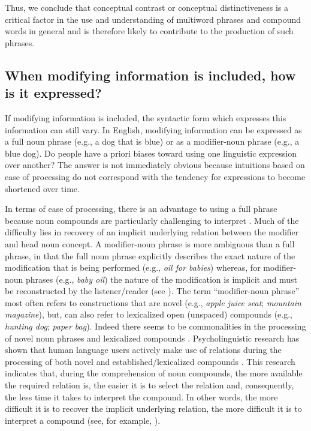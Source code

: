 \documentclass[output=paper]{langsci/langscibook}
\begin{document}
Thus, we conclude that conceptual contrast or conceptual
distinctiveness is a critical factor in the use and understanding of
multiword phrases and compound words in general and is therefore
likely to contribute to the production of such phrases.

\subsection{When modifying information is included, how is it expressed?}

If modifying information is included, the syntactic form which
expresses this information can still vary. In English, modifying
information can be expressed as a full noun phrase (e.g., a dog that
is blue) or as a modifier-noun phrase (e.g., a blue dog). Do people
have a priori biases toward using one linguistic expression over
another? The answer is not immediately obvious because intuitions
based on ease of processing do not correspond with the tendency for
expressions to become shortened over time.

In terms of ease of processing, there is an advantage to using a full
phrase because noun compounds are particularly challenging to
interpret
\citep{lapata2002disambiguation,copestake2005noun,libben2014nature}. Much
of the difficulty lies in recovery of an implicit underlying relation
between the modifier and head noun concept. A modifier-noun phrase is
more ambiguous than a full phrase, in that the full noun phrase
explicitly describes the exact nature of the modification that is
being performed (e.g., \textit{oil for babies}) whereas, for
modifier-noun phrases (e.g., \textit{baby oil}) the nature of the
modification is implicit and must be reconstructed by the
listener/reader (see \citealt{levi1978syntax,gagne1997influence}). The
term “modifier-noun phrase” most often refers to constructions that
are novel (e.g., \textit{apple juice seat}; \textit{mountain
  magazine}), but, can also refer to lexicalized open (unspaced)
compounds (e.g., \textit{hunting dog}; \textit{paper bag}). Indeed
there seems to be commonalities in the processing of novel noun
phrases and lexicalized compounds
\citep{gagne2006using}. Psycholinguistic research has shown that human
language users actively make use of relations during the processing of
both novel and established/lexicalized compounds
\citep{gagne1997influence,gagne2002lexical,gagne2009constituent,gagne2014conceptual}. This
research indicates that, during the comprehension of noun compounds,
the more available the required relation is, the easier it is to
select the relation and, consequently, the less time it takes to
interpret the compound. In other words, the more difficult it is to
recover the implicit underlying relation, the more difficult it is to
interpret a compound (see, for example,
\citealt{gagne1997influence,spalding2014relational,schmidtke2018conceptual}).
\end{document}
